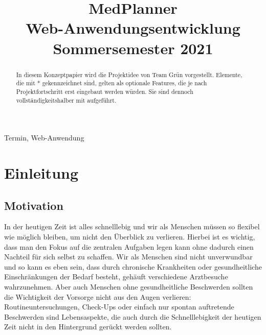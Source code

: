 \documentclass[conference]{IEEEtran}
\begin{document}
\title{MedPlanner\\
{\large Web-Anwendungsentwicklung Sommersemester 2021}
}

\author{
\and
{}
\and
{}
\and
{}
\and
{}
}

\maketitle

\begin{abstract}
In diesem Konzeptpapier wird die Projektidee von Team Grün vorgestellt. Elemente, die mit * gekennzeichnet sind, gelten als optionale Features, die je nach Projektfortschritt erst eingebaut werden würden. Sie sind dennoch vollständigkeitshalber mit aufgeführt.
\end{abstract}

\begin{IEEEkeywords}
Termin, Web-Anwendung
\end{IEEEkeywords}

\section{Einleitung}
\subsection{Motivation}
In der heutigen Zeit ist alles schnelllebig und wir als Menschen müssen so flexibel wie möglich bleiben, um nicht den Überblick zu verlieren. 
Hierbei ist es wichtig, dass man den Fokus auf die zentralen Aufgaben legen kann ohne dadurch einen Nachteil für sich selbst zu schaffen.
Wir als Menschen sind nicht unverwundbar und so kann es eben sein, dass durch chronische Krankheiten oder gesundheitliche Einschränkungen der Bedarf besteht, gehäuft verschiedene Arztbesuche wahrzunehmen.
Aber auch Menschen ohne gesundheitliche Beschwerden sollten die Wichtigkeit der Vorsorge nicht aus den Augen verlieren:
Routineuntersuchungen, Check-Ups oder einfach nur spontan auftretende Beschwerden sind Lebensaspekte, die auch durch die Schnelllebigkeit der heutigen Zeit nicht in den Hintergrund gerückt werden sollten.
\end{document}
